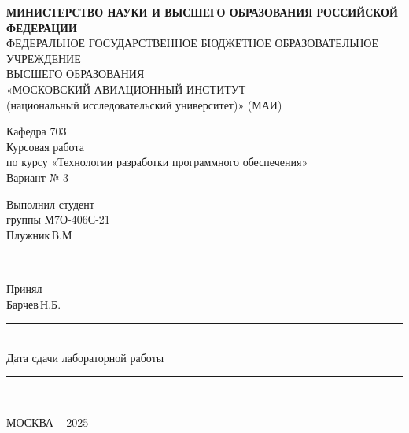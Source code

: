 \begin{titlepage}

\newpage
\fontsize{14pt}{16pt}\selectfont
\begin{center}
    \textbf{МИНИСТЕРСТВО НАУКИ И ВЫСШЕГО ОБРАЗОВАНИЯ РОССИЙСКОЙ ФЕДЕРАЦИИ} \\
    ФЕДЕРАЛЬНОЕ ГОСУДАРСТВЕННОЕ БЮДЖЕТНОЕ ОБРАЗОВАТЕЛЬНОЕ УЧРЕЖДЕНИЕ \\
    ВЫСШЕГО ОБРАЗОВАНИЯ \\
    «МОСКОВСКИЙ АВИАЦИОННЫЙ ИНСТИТУТ \\ 
    (национальный исследовательский университет)» (МАИ)

    \vspace{1cm}
    Кафедра 703 \\

    \vspace{1cm}
    Курсовая работа \\
    по курсу «Технологии разработки программного обеспечения» \\

    Вариант № 3 \\
\end{center}

\vspace{1cm}
\hfill
\begin{minipage}{0.4\textwidth}

    \raggedright

    Выполнил студент \\
    группы М7О-406С-21 \\
    Плужник\,В.М \\
    \vspace{0.5cm}
    \rule{5cm}{0.4pt} \\

    Принял \\
    Барчев\,Н.Б. \\
    \vspace{0.5cm}
    \rule{5cm}{0.4pt} \\

    Дата сдачи лабораторной работы \\
    \vspace{0.5cm}
    \rule{5cm}{0.4pt} \\

\end{minipage}

\vfill
\begin{center}
    МОСКВА – 2025
\end{center}

\end{titlepage}